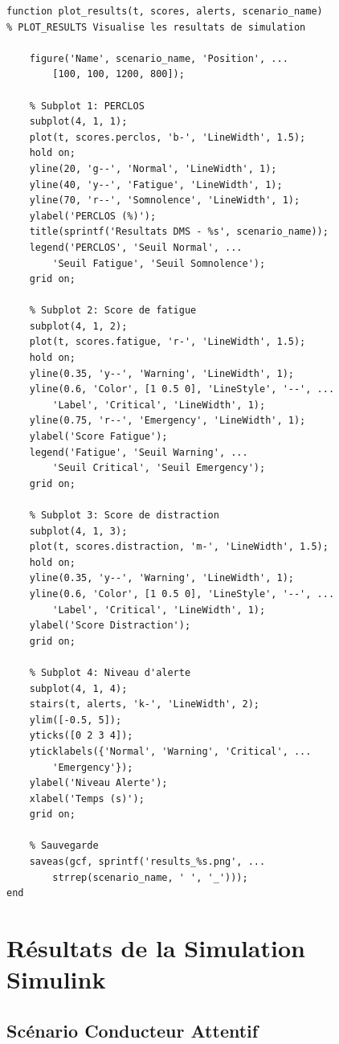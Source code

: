\begin{lstlisting}[style=matlabstyle, caption={Fonction de visualisation des résultats.}, label={lst:plot_results}]
function plot_results(t, scores, alerts, scenario_name)
% PLOT_RESULTS Visualise les resultats de simulation
    
    figure('Name', scenario_name, 'Position', ...
        [100, 100, 1200, 800]);
    
    % Subplot 1: PERCLOS
    subplot(4, 1, 1);
    plot(t, scores.perclos, 'b-', 'LineWidth', 1.5);
    hold on;
    yline(20, 'g--', 'Normal', 'LineWidth', 1);
    yline(40, 'y--', 'Fatigue', 'LineWidth', 1);
    yline(70, 'r--', 'Somnolence', 'LineWidth', 1);
    ylabel('PERCLOS (%)');
    title(sprintf('Resultats DMS - %s', scenario_name));
    legend('PERCLOS', 'Seuil Normal', ...
        'Seuil Fatigue', 'Seuil Somnolence');
    grid on;
    
    % Subplot 2: Score de fatigue
    subplot(4, 1, 2);
    plot(t, scores.fatigue, 'r-', 'LineWidth', 1.5);
    hold on;
    yline(0.35, 'y--', 'Warning', 'LineWidth', 1);
    yline(0.6, 'Color', [1 0.5 0], 'LineStyle', '--', ...
        'Label', 'Critical', 'LineWidth', 1);
    yline(0.75, 'r--', 'Emergency', 'LineWidth', 1);
    ylabel('Score Fatigue');
    legend('Fatigue', 'Seuil Warning', ...
        'Seuil Critical', 'Seuil Emergency');
    grid on;
    
    % Subplot 3: Score de distraction
    subplot(4, 1, 3);
    plot(t, scores.distraction, 'm-', 'LineWidth', 1.5);
    hold on;
    yline(0.35, 'y--', 'Warning', 'LineWidth', 1);
    yline(0.6, 'Color', [1 0.5 0], 'LineStyle', '--', ...
        'Label', 'Critical', 'LineWidth', 1);
    ylabel('Score Distraction');
    grid on;
    
    % Subplot 4: Niveau d'alerte
    subplot(4, 1, 4);
    stairs(t, alerts, 'k-', 'LineWidth', 2);
    ylim([-0.5, 5]);
    yticks([0 2 3 4]);
    yticklabels({'Normal', 'Warning', 'Critical', ...
        'Emergency'});
    ylabel('Niveau Alerte');
    xlabel('Temps (s)');
    grid on;
    
    % Sauvegarde
    saveas(gcf, sprintf('results_%s.png', ...
        strrep(scenario_name, ' ', '_')));
end
\end{lstlisting}

\section{Résultats de la Simulation Simulink}

\subsection{Scénario Conducteur Attentif}

